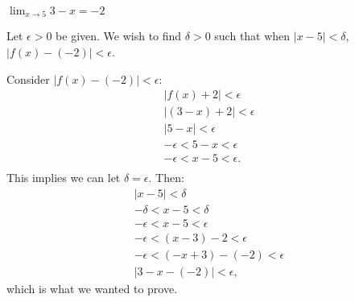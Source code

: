 {$\displaystyle \lim_{x\to 5} 3-x = -2$}
{Let $\epsilon >0$ be given. We wish to find $\delta >0$ such that when $|x-5|<\delta$, $|f(x)-(-2)|<\epsilon$. 

Consider $|f(x)-(-2)|<\epsilon$:
\begin{gather*}
|f(x) + 2 | < \epsilon \\
|(3-x) + 2 |<\epsilon \\
| 5-x | < \epsilon \\
-\epsilon < 5-x < \epsilon \\
-\epsilon < x-5 < \epsilon. \\
\end{gather*}
This implies we can let $\delta =\epsilon$. Then:
\begin{gather*}
|x-5|<\delta \\
-\delta < x-5 < \delta\\
-\epsilon < x-5 < \epsilon\\
-\epsilon < (x-3)-2 < \epsilon \\
-\epsilon < (-x+3)-(-2) < \epsilon \\
|3-x - (-2)| < \epsilon,
\end{gather*}
which is what we wanted to prove.
}

